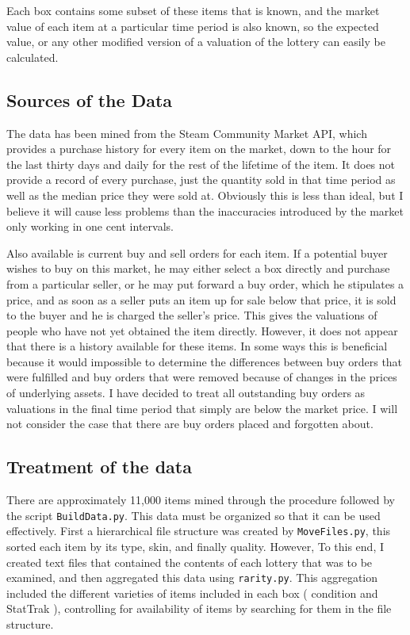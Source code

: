 \documentclass[12pt, letterpaper]{paper}
\begin{document}
Each box contains some subset of these items that is known, and the
market value of each item at a particular time period is also known,
so the expected value, or any other modified version of a valuation of
the lottery can easily be calculated.

\subsection{Sources of the Data}
\label{sec-3-2}
The data has been mined from the Steam Community Market API, which
provides a purchase history for every item on the market, down to the
hour for the last thirty days and daily for the rest of the lifetime
of the item. It does not provide a record of every purchase, just the
quantity sold in that time period as well as the median price they
were sold at. Obviously this is less than ideal, but I believe it will
cause less problems than the inaccuracies introduced by the market only
working in one cent intervals.

Also available is current buy and sell orders for each item. If a
potential buyer wishes to buy on this market, he may either select a
box directly and purchase from a particular seller, or he may put
forward a buy order, which he stipulates a price, and as soon as a
seller puts an item up for sale below that price, it is sold to the
buyer and he is charged the seller's price. This gives the
valuations of people who have not yet obtained the item directly.
However, it does not appear that there is a history available for
these items. In some ways this is beneficial because it would
impossible to determine the differences between buy orders that were
fulfilled and buy orders that were removed because of changes in the
prices of underlying assets. I have decided to treat all outstanding
buy orders as valuations in the final time period that simply are
below the market price. I will not consider the case that there are
buy orders placed and forgotten about.


\subsection{Treatment of the data}
\label{sec-3-3}
There are approximately 11,000 items mined through the procedure
followed by the script \texttt{BuildData.py}. This data must be organized so
that it can be used effectively. First a hierarchical file structure
was created by \texttt{MoveFiles.py}, this sorted each item by its type,
skin, and finally quality. However, To this end, I created text files
that contained the contents of each lottery that was to be examined,
and then aggregated this data using \texttt{rarity.py}. This aggregation
included the different varieties of items included in each box (
condition and StatTrak ), controlling for availability of items by
searching for them in the file structure.
\end{document}

